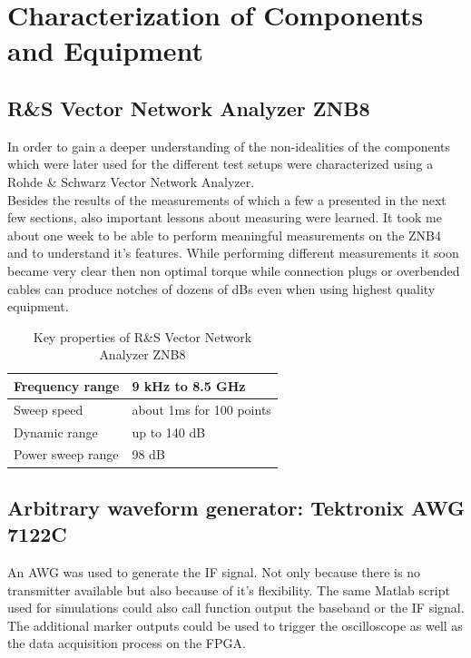 \chapter{Characterization of Components and Equipment}
\label{chap:comp}

\section{R\&S Vector Network Analyzer ZNB8}
In order to gain a deeper understanding of the non-idealities of the
components which were later used for the different test setups
were characterized using a Rohde \& Schwarz Vector Network Analyzer. \\

Besides the results of the measurements of which a few a presented
in the next few sections, also important lessons about measuring were
learned. It took me about one week to be able to perform meaningful
measurements on the ZNB4 and to understand it's features.
While performing different measurements it soon became very clear then
non optimal torque while connection plugs or overbended cables
can produce notches of dozens of dBs even when using highest quality
equipment. \\
\begin{table}[h]
  \centering
  \begin{tabular}{|l|l|}
    \hline
    Frequency range & 9 kHz to 8.5 GHz \\ \hline
    Sweep speed & about 1ms for 100 points \\ \hline
    Dynamic range & up to 140 dB \\ \hline
    Power sweep range & 98 dB \\ \hline
  \end{tabular}
  \caption{Key properties of R\&S Vector Network Analyzer ZNB8}
  \label{tab:awg}
\end{table}

\section{Arbitrary waveform generator: Tektronix AWG 7122C}
\label{sec:comp_awg}
An \acrfull{AWG} was used to generate the \gls{IF} signal.
Not only because there is no transmitter available but also because of
it's flexibility. The same Matlab script used for simulations could
also call function output the baseband or the \gls{IF} signal.
The additional marker outputs could be used to trigger the oscilloscope
as well as the data acquisition process on the \gls{FPGA}.

